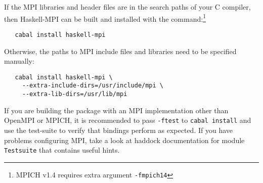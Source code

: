 \documentclass{tmr}
\begin{document}
If the MPI libraries and header files are in the search paths of your C
compiler, then Haskell-MPI can be built and installed with the
command:\footnote{MPICH v1.4 requires extra argument \verb|-fmpich14|}
\begin{Verbatim}
   cabal install haskell-mpi
\end{Verbatim}
Otherwise, the paths to MPI include
files and libraries need to be specified manually:
\begin{Verbatim}
   cabal install haskell-mpi \
     --extra-include-dirs=/usr/include/mpi \
     --extra-lib-dirs=/usr/lib/mpi
\end{Verbatim}

If you are building the package with an MPI implementation other than
OpenMPI or MPICH, it is recommended to pass \verb|-ftest| to
\verb|cabal install| and use the test-suite to verify that bindings
perform as expected. If you have problems configuring MPI, take a 
look at haddock documentation for module \verb|Testsuite| that contains useful hints.


\end{document}
